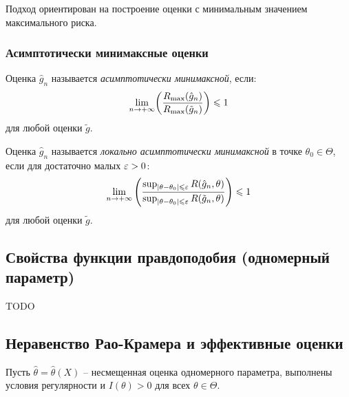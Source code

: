 Подход ориентирован на построение оценки с минимальным значением максимального риска.

\subsubsection{Асимптотически минимаксные оценки}
\begin{definition}
	Оценка $\hat{g}_{n}$ называется \textit{асимптотически минимаксной}, если:
	\[
		\lim_{n \to +\infty}\parens*{\frac{R_{\max}(\hat{g}_n)}{R_{\max}(\tilde{g}_n)}} \leqslant 1
	\]
	для любой оценки $\tilde{g}$.
\end{definition}

\begin{definition}
	Оценка $\hat{g}_{n}$ называется \textit{локально асимптотически минимаксной} 
    в точке $\theta_{0} \in \Theta$, если для достаточно малых $\e > 0$:
	\[
        \lim_{n \to +\infty}{\parens*{\frac{\sup_{\abs{\theta - \theta_0} 
                \leqslant \varepsilon}{R(\hat{g}_n, \theta)}}
                {\sup_{\abs{\theta - \theta_0} \leqslant \varepsilon}
        {R(\tilde{g}_n, \theta)}}}} \leqslant 1
	\]
	для любой оценки $\tilde{g}$.
\end{definition}

\subsection{Свойства функции правдоподобия (одномерный параметр)}
TODO

\subsection{Неравенство Рао-Крамера и эффективные оценки}
Пусть $\hat{\theta} = \hat{\theta}(X)$ -- несмещенная оценка одномерного параметра, выполнены условия регулярности и $I(\theta) > 0$ для всех $\theta \in \Theta$.

